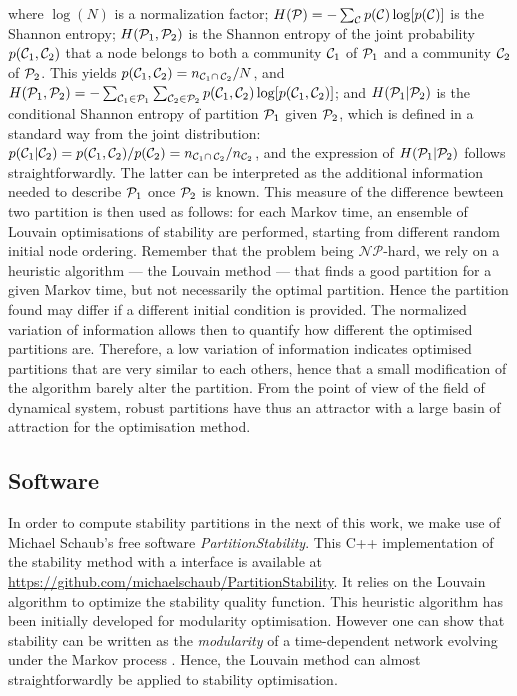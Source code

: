 \begin{sloppypar}
where $\log(N)$ is a normalization factor; $H(\P) = -\sum_{\C} p(\C) \log[p(\C)]$ is the Shannon entropy; $H(\P_1,\P_2)$ is the Shannon entropy of the joint probability $p(\C_1,\C_2)$ that a node belongs to both a community $\C_1$ of $\P_1$ and a community $\C_2$ of $\P_2$. This yields $p(\C_1,\C_2) = n_{\C_1 \cap\, \C_2}/N$, and $H(\P_1,\P_2) = -\sum_{\C_1 \in \P_1} \sum_{\C_2 \in \P_2} p(\C_1,\C_2) \log[p(\C_1,\C_2)]$; and $H(\P_1|\P_2)$ is the conditional Shannon entropy of partition $\P_1$ given $\P_2$, which is defined in a standard way from the joint distribution: $p(\C_1|\C_2) = p(\C_1,\C_2)/p(\C_2) = n_{\C_1\cap\, \C_2}/n_{\C_2}$, and the expression of $H(\P_1|\P_2)$ follows straightforwardly. The latter can be interpreted as the additional information needed to describe $\P_1$ once $\P_2$ is known. This measure of the difference bewteen two partition is then used as follows: for each Markov time, an ensemble of Louvain optimisations of stability are performed, starting from different random initial node ordering. Remember that the problem being $\mathcal{NP}$-hard, we rely on a heuristic algorithm --- the Louvain method --- that finds a good partition for a given Markov time, but not necessarily the optimal partition. Hence the partition found may differ if a different initial condition is provided. The normalized variation of information allows then to quantify how different the optimised partitions are. Therefore, a low variation of information indicates optimised partitions that are very similar to each others, hence that a small modification of the algorithm barely alter the partition. From the point of view of the field of dynamical system, robust partitions have thus an attractor with a large basin of attraction for the optimisation method. 
\end{sloppypar}

\subsection{Software}
In order to compute stability partitions in the next of this work, we make use of Michael Schaub's free software \textit{PartitionStability}. This C++ implementation of the stability method with a \matlab interface is available at \url{https://github.com/michaelschaub/PartitionStability}. It relies on the Louvain algorithm \cite{blondel2008fast} to optimize the stability quality function. This heuristic algorithm has been initially developed for modularity optimisation. However one can show that stability can be written as the \textit{modularity} of a time-dependent network evolving under the Markov process \cite{lambiotte2009laplacian}. Hence, the Louvain method can almost straightforwardly be applied to stability optimisation.


